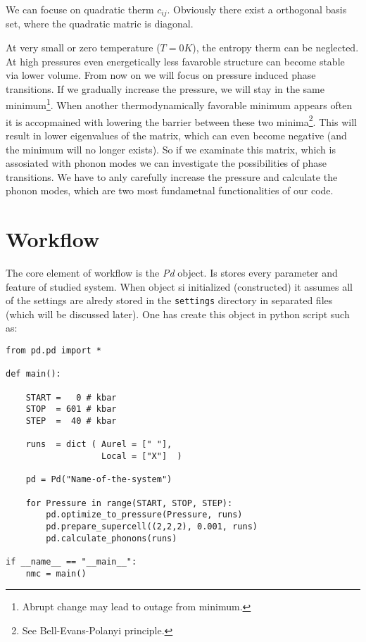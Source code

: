 \documentclass[12pt]{article}
\begin{document}
We can focuse on quadratic therm $c_{ij}$. Obviously there exist a orthogonal basis set, where the quadratic matric is diagonal. 

At very small or zero temperature ($T = 0K$), the entropy therm can be neglected. At high pressures even energetically less favaroble structure can become stable via lower volume. From now on we will focus on pressure induced phase transitions. If we gradually increase the pressure, we will stay in the same minimum\footnote{Abrupt change may lead to outage from minimum.}. When another thermodynamically favorable minimum appears often it is accopmained with lowering the barrier between these two minima\footnote{See Bell-Evans-Polanyi principle.}. This will result in lower eigenvalues of the matrix, which can even become negative (and the minimum will no longer exists). So if we examinate this matrix, which is assosiated with phonon modes we can investigate the possibilities of phase transitions. We have to anly carefully increase the pressure and calculate the phonon modes, which are two most fundametnal functionalities of our code.


\section{Workflow}

The core element of \pe workflow is the \textit{Pd} object. Is stores every parameter and feature of studied system. When object si initialized (constructed) it assumes all of the settings are alredy stored in the \texttt{settings} directory in separated files (which will be discussed later). One has create this object in python script such as:

\begin{verbatim}
from pd.pd import *

def main():

    START =   0 # kbar
    STOP  = 601 # kbar
    STEP  =  40 # kbar

    runs  = dict ( Aurel = [" "],
                   Local = ["X"]  )

    pd = Pd("Name-of-the-system")

    for Pressure in range(START, STOP, STEP):
        pd.optimize_to_pressure(Pressure, runs)
        pd.prepare_supercell((2,2,2), 0.001, runs)
        pd.calculate_phonons(runs)

if __name__ == "__main__":
    nmc = main()
\end{verbatim}
\end{document}

